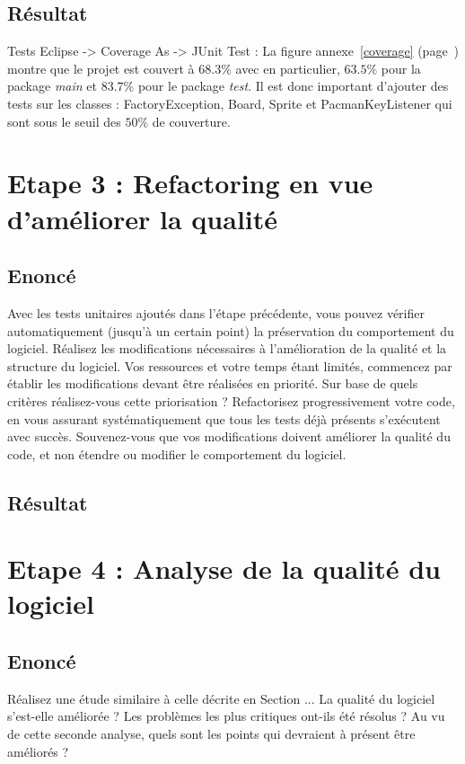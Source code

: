 \documentclass[12pt,a4paper,final]{article}
\newcommand{\annexe}[1]{annexe~\ref{#1} (page~\pageref{#1})}
\begin{document}
\subsection{Résultat}

Tests  Eclipse -> Coverage As -> JUnit Test : La figure \annexe{coverage} montre que le projet est couvert à $68.3 \%$ avec en particulier, $63.5\%$ pour la package \emph{main} et $83.7\%$ pour le package \emph{test}.
 Il est donc important d'ajouter des tests sur les classes : FactoryException, Board, Sprite et PacmanKeyListener qui sont sous le seuil des $50 \%$ de couverture.

\section{Etape 3 : Refactoring en vue d'améliorer la qualité}\label{sec:etape3}
\subsection{Enoncé}
Avec les tests unitaires ajoutés dans l'étape précédente, vous pouvez vérifier automatiquement (jusqu'à un certain point) la préservation du comportement du logiciel. Réalisez les modifications nécessaires à l'amélioration de la qualité et la structure du logiciel. 
Vos ressources et votre temps étant limités, commencez par établir les modifications devant être réalisées en priorité. Sur base de quels critères réalisez-vous cette priorisation ?
Refactorisez progressivement votre code, en vous assurant systématiquement que tous les tests déjà présents s'exécutent avec succès. Souvenez-vous que vos modifications doivent améliorer la qualité du code, et non étendre ou modifier le comportement du logiciel.

\subsection{Résultat}



\section{Etape 4 : Analyse de la qualité du logiciel}\label{sec:etape4}
\subsection{Enoncé}
Réalisez une étude similaire à celle décrite en Section ... La qualité du logiciel s'est-elle améliorée ? Les problèmes les plus critiques ont-ils été résolus ? Au vu de cette seconde analyse, quels sont les points qui devraient à présent être améliorés ?
\end{document}
